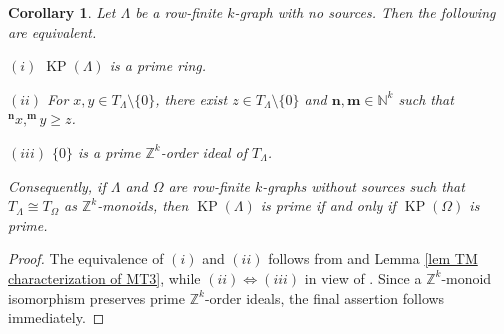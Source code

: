 \documentclass[a4paper,reqno,12pt]{amsart}
\numberwithin{equation}{section}
\newtheorem{cor}[thm]{Corollary}
\theoremstyle{definition}
\theoremstyle{remark}
\newcommand{\KP}{\operatorname{KP}}
\newcommand{\N}{\mathbf{n}}
\newcommand{\M}{\mathbf{m}}
\begin{document}
\begin{cor}\label{cor TM characterization of prime KPA}
Let $\Lambda$ be a row-finite $k$-graph with no sources. Then the following are equivalent.

$(i)$ $\KP(\Lambda)$ is a prime ring.

$(ii)$ For $x,y\in T_\Lambda\setminus \{0\}$, there exist $z\in T_\Lambda\setminus \{0\}$ and $\N,\M\in \mathbb{N}^k$ such that $^\N x,^\M y\ge z$.

$(iii)$ $\{0\}$ is a prime $\mathbb{Z}^k$-order ideal of $T_\Lambda$.

Consequently, if $\Lambda$ and $\Omega$ are row-finite $k$-graphs without sources such that $T_\Lambda\cong T_\Omega$ as $\mathbb{Z}^k$-monoids, then $\KP(\Lambda)$ is prime if and only if $\KP(\Omega)$ is prime.
\end{cor}

\begin{proof}
The equivalence of $(i)$ and $(ii)$ follows from \cite[Theorem 3.1]{Larki} and Lemma \ref{lem TM characterization of MT3}, while $(ii)\Longleftrightarrow (iii)$ in view of \cite[Proposition 4.6]{HMPS1}. Since a $\mathbb{Z}^k$-monoid isomorphism preserves prime $\mathbb{Z}^k$-order ideals, the final assertion follows immediately.
\end{proof}
\end{document}

